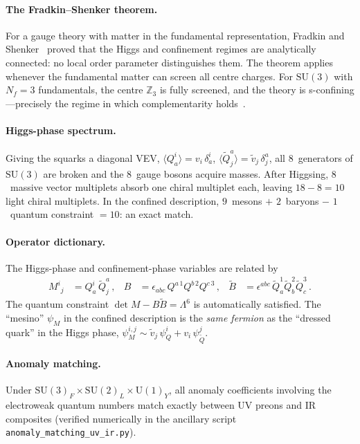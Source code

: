 \documentclass[12pt,a4paper]{article}
\newcommand{\SU}{\mathrm{SU}}
\newcommand{\UU}{\mathrm{U}}
\newcommand{\Nf}{N_f}
\begin{document}
\paragraph{The Fradkin--Shenker theorem.}
For a gauge theory with matter in the fundamental representation,
Fradkin and Shenker~\cite{FradkinShenker:1979} proved that the
Higgs and confinement regimes are analytically connected: no
local order parameter distinguishes them.
The theorem applies whenever the fundamental
matter can screen all centre charges.  For $\SU(3)$ with $\Nf = 3$
fundamentals, the centre $\mathbb{Z}_3$ is fully screened, and the
theory is s-confining---precisely the regime in which complementarity
holds~\cite{Acharya:2025}.

\paragraph{Higgs-phase spectrum.}
Giving the squarks a diagonal VEV,
$\langle Q^i_a \rangle = v_i\,\delta^i_a$,
$\langle \tilde{Q}^a_j \rangle = \tilde{v}_j\,\delta^a_j$,
all 8~generators of $\SU(3)$ are broken and the 8~gauge bosons
acquire masses.
After Higgsing, $8$~massive vector multiplets absorb one chiral
multiplet each, leaving $18 - 8 = 10$ light chiral multiplets.
In the confined description,
$9$~mesons $+$ $2$~baryons $-$ $1$~quantum constraint
$= 10$: an exact match.

\paragraph{Operator dictionary.}
The Higgs-phase and confinement-phase variables are related by
\begin{align}
  M^i{}_j &= Q^i_a\,\tilde{Q}^a_j\,,  &
  B &= \epsilon_{abc}\,Q^{a\,1}Q^{b\,2}Q^{c\,3}\,,  &
  \tilde{B} &= \epsilon^{abc}\,\tilde{Q}_a^1\tilde{Q}_b^2
    \tilde{Q}_c^3\,.
  \label{eq:operator_map}
\end{align}
The quantum constraint $\det M - B\tilde{B} = \Lambda^6$ is
automatically satisfied.
The ``mesino'' $\psi_M$ in the confined description is the
\emph{same fermion} as the ``dressed quark'' in the Higgs phase,
$\psi_M^{i,j} \sim \tilde{v}_j\,\psi_Q^i + v_i\,\psi_{\tilde{Q}}^j$.

\paragraph{Anomaly matching.}
Under $\SU(3)_F \times \SU(2)_L \times \UU(1)_Y$,
all anomaly coefficients involving the electroweak quantum
numbers match exactly between UV preons and IR composites
(verified numerically in the ancillary
script \texttt{anomaly\_matching\_uv\_ir.py}).
\end{document}
